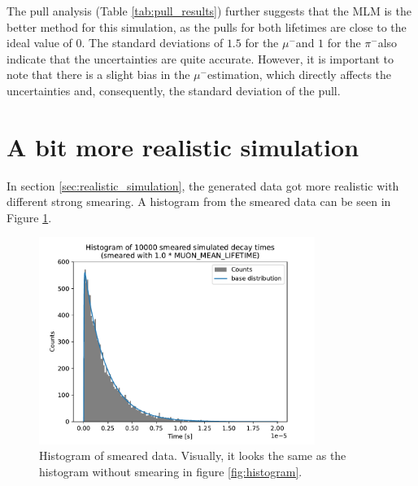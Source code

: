 \documentclass[11pt, a4paper, oneside]{book}
\newcommand\Plotwidth{0.8}
\newcommand{\pion}{$\pi^{-}$}
\newcommand{\muon}{$\mu^{-}$}
\begin{document}
The pull analysis (Table \ref{tab:pull_results}) further suggests that the MLM is the better method for this simulation, as the pulls for both lifetimes are close to the ideal value of 0. The standard deviations of $1.5$ for the \muon and $1$ for the \pion also indicate that the uncertainties are quite accurate. However, it is important to note that there is a slight bias in the \muon estimation, which directly affects the uncertainties and, consequently, the standard deviation of the pull.


\newpage
\section{A bit more realistic simulation} \label{sec:more_realisitic_results}

In section \ref{sec:realistic_simulation}, the generated data got more realistic with different strong smearing. A histogram from the smeared data can be seen in Figure \ref{fig:smeared_histogram}.

\begin{figure}[h]
  \centering
  \includegraphics[width=\Plotwidth\textwidth]{images/smeared_decay_histogram_150bins.pdf}
  \caption{Histogram of smeared data. Visually, it looks the same as the histogram without smearing in figure \ref{fig:histogram}.}
  \label{fig:smeared_histogram}
\end{figure}
\end{document}
